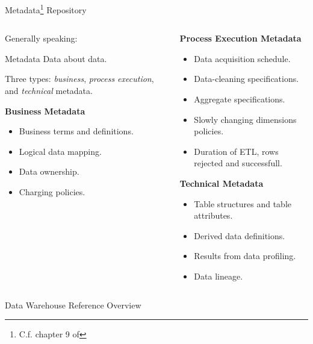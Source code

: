 \begin{frame}{Metadata\footnote{C.f. chapter 9 of } Repository}
	\begin{columns}
		\begin{column}{0.5\textwidth}
			Generally speaking:

			\begin{block}{Metadata}
				Data about data.
			\end{block}

			Three types: \textit{business}, \textit{process execution}, and
			\textit{technical} metadata.

			\vspace*{0.8em}
			\textbf{Business Metadata}
			\begin{itemize}
				\item Business terms and definitions.
				\item Logical data mapping.
				\item Data ownership.
				\item Charging policies.
			\end{itemize}
		\end{column}

		\begin{column}{0.5\textwidth}
			\textbf{Process Execution Metadata}
			\begin{itemize}
				\item Data acquisition schedule.
				\item Data-cleaning specifications.
				\item Aggregate specifications.
				\item Slowly changing dimensions policies.
				\item Duration of ETL, rows rejected and successfull.
			\end{itemize}
			\textbf{Technical Metadata}
			\begin{itemize}
				\item Table structures and table attributes.
				\item Derived data definitions.
				\item Results from data profiling.
				\item Data lineage.
			\end{itemize}

		\end{column}
	\end{columns}
\end{frame}

\begin{frame}{Data Warehouse Reference Overview}
	
\end{frame}
